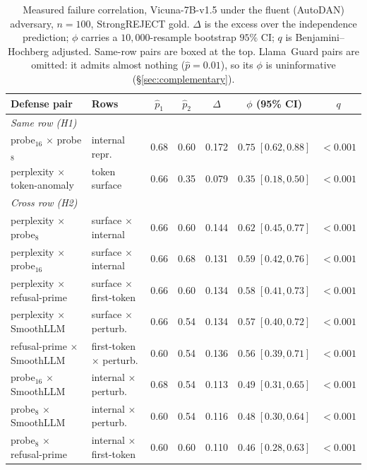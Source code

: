 \begin{table}[t]
\centering
\caption{Measured failure correlation, Vicuna-7B-v1.5 under the fluent (AutoDAN) adversary,
$n=100$, StrongREJECT gold. $\Delta$ is the excess over the independence prediction; $\phi$
carries a $10{,}000$-resample bootstrap $95\%$ CI; $q$ is Benjamini--Hochberg adjusted.
Same-row pairs are boxed at the top. Llama~Guard pairs are omitted: it admits almost nothing
($\hat p = 0.01$), so its $\phi$ is uninformative (\S\ref{sec:complementary}).}
\label{tab:dependency}
\begin{tabular}{llccccc}
\toprule
Defense pair & Rows & $\hat p_1$ & $\hat p_2$ & $\Delta$ & $\phi$ (95\% CI) & $q$ \\
\midrule
\multicolumn{7}{l}{\emph{Same row (H1)}}\\
probe$_{16}$ $\times$ probe$_{8}$    & internal repr.  & 0.68 & 0.60 & 0.172 & $\mathbf{0.75}\;[0.62,0.88]$ & $<0.001$ \\
perplexity $\times$ token-anomaly    & token surface   & 0.66 & 0.35 & 0.079 & $\mathbf{0.35}\;[0.18,0.50]$ & $<0.001$ \\
\midrule
\multicolumn{7}{l}{\emph{Cross row (H2)}}\\
perplexity $\times$ probe$_{8}$      & surface $\times$ internal    & 0.66 & 0.60 & 0.144 & $0.62\;[0.45,0.77]$ & $<0.001$ \\
perplexity $\times$ probe$_{16}$     & surface $\times$ internal    & 0.66 & 0.68 & 0.131 & $0.59\;[0.42,0.76]$ & $<0.001$ \\
perplexity $\times$ refusal-prime    & surface $\times$ first-token & 0.66 & 0.60 & 0.134 & $0.58\;[0.41,0.73]$ & $<0.001$ \\
perplexity $\times$ SmoothLLM        & surface $\times$ perturb.    & 0.66 & 0.54 & 0.134 & $0.57\;[0.40,0.72]$ & $<0.001$ \\
refusal-prime $\times$ SmoothLLM     & first-token $\times$ perturb.& 0.60 & 0.54 & 0.136 & $0.56\;[0.39,0.71]$ & $<0.001$ \\
probe$_{16}$ $\times$ SmoothLLM      & internal $\times$ perturb.   & 0.68 & 0.54 & 0.113 & $0.49\;[0.31,0.65]$ & $<0.001$ \\
probe$_{8}$ $\times$ SmoothLLM       & internal $\times$ perturb.   & 0.60 & 0.54 & 0.116 & $0.48\;[0.30,0.64]$ & $<0.001$ \\
probe$_{8}$ $\times$ refusal-prime   & internal $\times$ first-token& 0.60 & 0.60 & 0.110 & $0.46\;[0.28,0.63]$ & $<0.001$ \\

\end{tabular}
\end{table}
